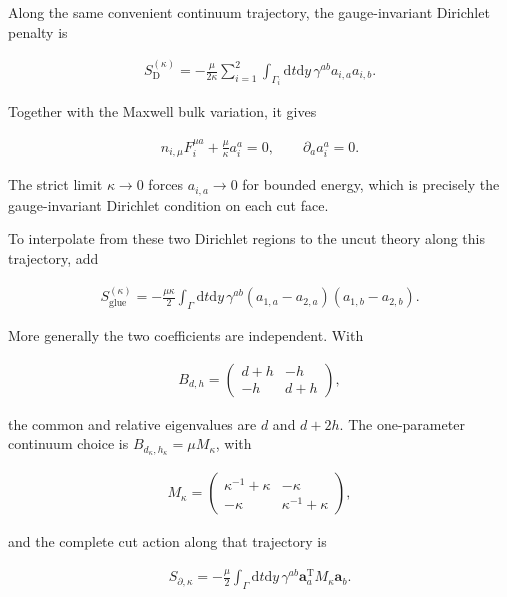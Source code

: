 Along the same convenient continuum trajectory, the gauge-invariant Dirichlet penalty is

\begin{align}
S_{\mathrm D}^{(\kappa)}
=-\frac\mu{2\kappa}
\sum_{i=1}^2\int_{\Gamma_i}\mathrm dt\mathrm dy\,
\gamma^{ab}a_{i,a}a_{i,b}.
\end{align}

Together with the Maxwell bulk variation, it gives

\begin{align}
n_{i,\mu}F_i^{\mu a}
+\frac\mu\kappa a_i^a=0,
\qquad
\partial_a a_i^a=0.
\end{align}

The strict limit $\kappa\to0$ forces $a_{i,a}\to0$ for bounded energy, which is precisely the gauge-invariant Dirichlet condition on each cut face.

To interpolate from these two Dirichlet regions to the uncut theory along this trajectory, add

\begin{align}
S_{\mathrm{glue}}^{(\kappa)}
=-\frac{\mu\kappa}{2}\int_\Gamma\mathrm dt\mathrm dy\,
\gamma^{ab}(a_{1,a}-a_{2,a})(a_{1,b}-a_{2,b}).
\end{align}

More generally the two coefficients are independent. With

\begin{align}
B_{d,h}
=\begin{pmatrix}
d+h&-h\\
-h&d+h
\end{pmatrix},
\end{align}

the common and relative eigenvalues are $d$ and $d+2h$. The one-parameter continuum choice is $B_{d_\kappa,h_\kappa}=\mu M_\kappa$, with

\begin{align}
M_\kappa=
\begin{pmatrix}
\kappa^{-1}+\kappa&-\kappa\\
-\kappa&\kappa^{-1}+\kappa
\end{pmatrix},
\end{align}

and the complete cut action along that trajectory is

\begin{align}
S_{\partial,\kappa}
=-\frac\mu2\int_\Gamma\mathrm dt\mathrm dy\,
\gamma^{ab}\boldsymbol a_a^{\mathrm T}M_\kappa\boldsymbol a_b.
\end{align}

